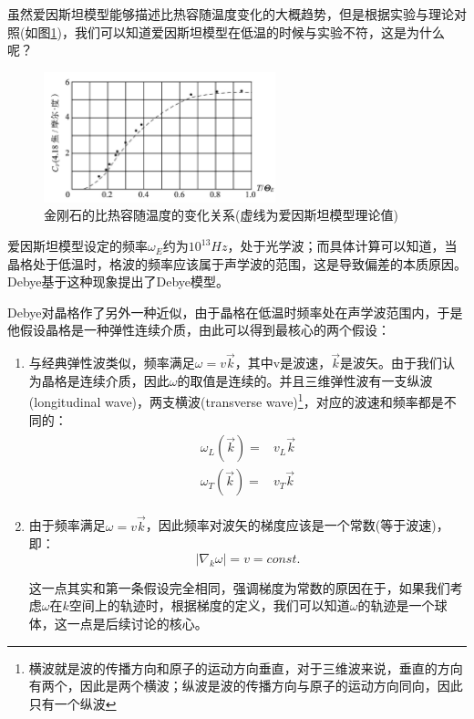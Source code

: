 \documentclass{ctexart}
\begin{document}
                虽然爱因斯坦模型能够描述比热容随温度变化的大概趋势，但是根据实验与理论对照(如图\ref{fig:Einsteinmodel_A})，我们可以知道爱因斯坦模型在低温的时候与实验不符，这是为什么呢？
                \begin{figure}[H]
                    \centering
                    \includegraphics[width=0.6\textwidth]{figure/金刚石比热容随温度的关系.jpg}
                    \caption{金刚石的比热容随温度的变化关系(虚线为爱因斯坦模型理论值)}
                    \label{fig:Einsteinmodel_A}
                \end{figure}
                
                爱因斯坦模型设定的频率$\omega_E$约为$10^{13}Hz$，处于光学波；而具体计算可以知道，当晶格处于低温时，格波的频率应该属于声学波的范围，这是导致偏差的本质原因。Debye基于这种现象提出了Debye模型。
                
                Debye对晶格作了另外一种近似，由于晶格在低温时频率处在声学波范围内，于是他假设晶格是一种弹性连续介质，由此可以得到最核心的两个假设：
                \begin{enumerate}
                    \item 与经典弹性波类似，频率满足$\omega=v\vec{k}$，其中v是波速，$\vec{k}$是波矢。由于我们认为晶格是连续介质，因此$\omega$的取值是连续的。并且三维弹性波有一支纵波(longitudinal wave)，两支横波(transverse wave)\footnote{横波就是波的传播方向和原子的运动方向垂直，对于三维波来说，垂直的方向有两个，因此是两个横波；纵波是波的传播方向与原子的运动方向同向，因此只有一个纵波}，对应的波速和频率都是不同的：
                    \begin{align}
                        \begin{split}
                            \omega_L(\vec{k})=&v_L\vec{k}\\
                            \omega_T(\vec{k})=&v_T\vec{k}
                        \end{split}
                    \end{align}
                    \item 由于频率满足$\omega=v\vec{k}$，因此频率对波矢的梯度应该是一个常数(等于波速)，即：
                    \begin{equation}
                        |\nabla_k\omega|=v=const.
                    \end{equation}
                    
                    这一点其实和第一条假设完全相同，强调梯度为常数的原因在于，如果我们考虑$\omega$在$k$空间上的轨迹时，根据梯度的定义，我们可以知道$\omega$的轨迹是一个球体，这一点是后续讨论的核心。
                \end{enumerate}
                
\end{document}
